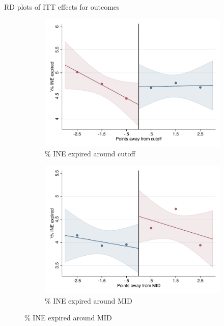 \documentclass[notes,11pt, aspectratio=169]{beamer}
\begin{document}
\begin{frame}{RD plots of ITT effects for outcomes}
\hyperlink{ITT_rd_plot_IPN}{}
\begin{figure}

    \begin{subfigure}{0.45\textwidth}
        \centering
        \caption{\% INE expired around cutoff}
        \includegraphics[width=\textwidth]{04_Figures/rd_plot_tau_Expired_INE_IPN3.pdf}
    \end{subfigure}
    \begin{subfigure}{0.45\textwidth}
        \centering
        \caption{\% INE expired around MID}
        \includegraphics[width=\textwidth]{04_Figures/rd_plot_mid_Expired_INE_IPN3.pdf}
    \end{subfigure}
    
\end{figure}
\end{frame}
\end{document}
